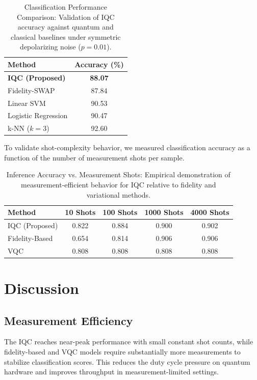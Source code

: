 \documentclass[conference]{IEEEtran}
\begin{document}
\begin{table}[ht]
\centering
\caption{Classification Performance Comparison: Validation of IQC accuracy against quantum and classical baselines under symmetric depolarizing noise ($p=0.01$).}
\label{tab:metrics}
\begin{tabular}{l c}
\toprule
Method & Accuracy (\%) \\
\midrule
\textbf{IQC (Proposed)} & \textbf{88.07} \\
Fidelity-SWAP & 87.84 \\
Linear SVM & 90.53 \\
Logistic Regression & 90.47 \\
k-NN ($k=3$) & 92.60 \\
\bottomrule
\end{tabular}
\end{table}

To validate shot-complexity behavior, we measured classification accuracy as a function of the number of measurement shots per sample.

\begin{table}[ht]
\centering
\caption{Inference Accuracy vs. Measurement Shots: Empirical demonstration of measurement-efficient behavior for IQC relative to fidelity and variational methods.}
\begin{tabular}{l c c c c}
\toprule
Method & 10 Shots & 100 Shots & 1000 Shots & 4000 Shots \\
\midrule
IQC (Proposed) & 0.822 & 0.884 & 0.900 & 0.902 \\
Fidelity-Based & 0.654 & 0.814 & 0.906 & 0.906 \\
VQC & 0.808 & 0.808 & 0.808 & 0.808 \\
\bottomrule
\end{tabular}
\end{table}

\section{Discussion}

\subsection{Measurement Efficiency}
The IQC reaches near-peak performance with small constant shot counts, while fidelity-based and VQC models require substantially more measurements to stabilize classification scores. This reduces the duty cycle pressure on quantum hardware and improves throughput in measurement-limited settings.
\end{document}
